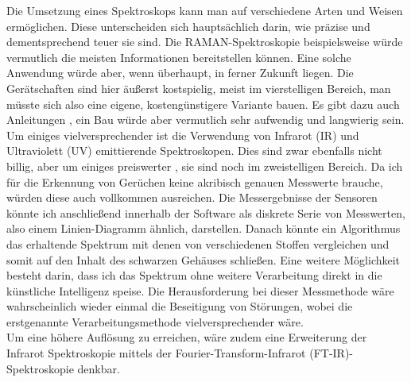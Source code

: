 \documentclass[10pt]{article}
\begin{document}
Die Umsetzung eines Spektroskops kann man auf verschiedene Arten und Weisen ermöglichen. Diese unterscheiden sich hauptsächlich darin, wie präzise und dementsprechend teuer sie sind. 
Die RAMAN-Spektroskopie beispielsweise würde vermutlich die meisten Informationen bereitstellen können. Eine solche Anwendung würde aber, wenn überhaupt, in ferner Zukunft liegen. 
Die Gerätschaften sind hier äußerst kostspielig, meist im vierstelligen Bereich, man müsste sich also eine eigene, kostengünstigere
Variante bauen. Es gibt dazu auch Anleitungen \autocite{RamanBauTheorie} \autocite{RamanPi}, ein Bau würde aber vermutlich sehr aufwendig und langwierig sein. Um einiges vielversprechender 
ist die Verwendung von Infrarot (IR) und Ultraviolett (UV) emittierende Spektroskopen. Dies sind zwar ebenfalls nicht billig, aber um einiges preiswerter \autocite{UV_IR_Sensor}, sie sind
noch im zweistelligen Bereich. Da ich für die Erkennung von Gerüchen keine akribisch genauen Messwerte brauche, würden diese auch vollkommen ausreichen. Die Messergebnisse der Sensoren
könnte ich anschließend innerhalb der Software als diskrete Serie von Messwerten, also einem Linien-Diagramm ähnlich, darstellen. Danach könnte ein Algorithmus das erhaltende Spektrum
mit denen von verschiedenen Stoffen vergleichen und somit auf den Inhalt des schwarzen Gehäuses schließen. Eine weitere Möglichkeit besteht darin, dass ich das Spektrum ohne weitere Verarbeitung 
direkt in die künstliche Intelligenz speise. Die Herausforderung bei dieser Messmethode wäre wahrscheinlich wieder einmal die Beseitigung von Störungen, wobei die erstgenannte
Verarbeitungsmethode vielversprechender wäre.\\
Um eine höhere Auflösung zu erreichen, wäre zudem eine Erweiterung der Infrarot Spektroskopie mittels der Fourier-Transform-Infrarot (FT-IR)-Spektroskopie \autocite{FTIR} denkbar. 
\end{document}
